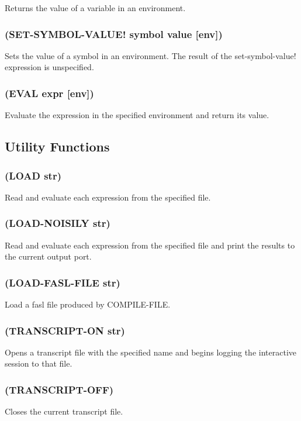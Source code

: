 \documentclass[11pt]{article}
\begin{document}
Returns the value of a variable in an environment.
\subsubsection{(SET-SYMBOL-VALUE! symbol value [env])}
\label{sec-4-40-7}

Sets the value of a symbol in an environment.  The result of the
set-symbol-value! expression is unspecified.
\subsubsection{(EVAL expr [env])}
\label{sec-4-40-8}

Evaluate the expression in the specified environment and return its
value.
\subsection{Utility Functions}
\label{sec-4-41}

\subsubsection{(LOAD str)}
\label{sec-4-41-1}

Read and evaluate each expression from the specified file.
\subsubsection{(LOAD-NOISILY str)}
\label{sec-4-41-2}

Read and evaluate each expression from the specified file and print
the results to the current output port.
\subsubsection{(LOAD-FASL-FILE str)}
\label{sec-4-41-3}

Load a fasl file produced by COMPILE-FILE.
\subsubsection{(TRANSCRIPT-ON str)}
\label{sec-4-41-4}

Opens a transcript file with the specified name and begins logging
the interactive session to that file.
\subsubsection{(TRANSCRIPT-OFF)}
\label{sec-4-41-5}

Closes the current transcript file.
\end{document}
